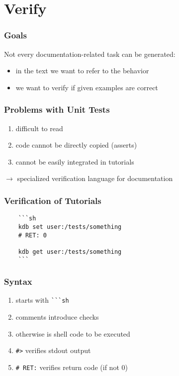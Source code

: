 \section{Verify}

\begin{frame}
	\frametitle{Goals}

	Not every documentation-related task can be generated:

	\begin{itemize}[<+-| alert@+>]
	\item in the text we want to refer to the behavior
	\item we want to verify if given examples are correct
	\end{itemize}
\end{frame}

\begin{frame}
	\frametitle{Problems with Unit Tests}

	\begin{enumerate}[<+-| alert@+>]
	\item difficult to read
	\item code cannot be directly copied (asserts)
	\item cannot be easily integrated in tutorials
	\end{enumerate}

	\pause[\thebeamerpauses]  %

	$\rightarrow$ specialized verification language for documentation
\end{frame}

\begin{frame}[fragile]
	\frametitle{Verification of Tutorials}

	\begin{lstlisting}
	```sh
	kdb set user:/tests/something
	# RET: 0

	kdb get user:/tests/something
	```
\end{lstlisting}
\end{frame}

\begin{frame}[fragile]
	\frametitle{Syntax}

	\begin{enumerate}[<+-| alert@+>]
	\item starts with \verb+```sh+
	\item comments introduce checks
	\item otherwise is shell code to be executed
	\item \verb+#>+ verifies stdout output
	\item \verb+# RET:+ verifies return code (if not 0)
	\end{enumerate}
\end{frame}

